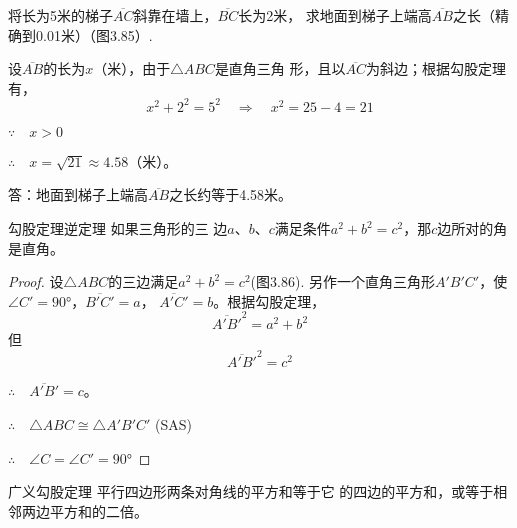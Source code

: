 \begin{example}
将长为5米的梯子$\overline{AC}$斜靠在墙上，$\overline{BC}$长为2米，
求地面到梯子上端高$\overline{AB}$之长（精确到0.01米）（图3.85）.
\end{example}



\begin{solution}
    设$\overline{AB}$的长为$x$（米），由于$\triangle ABC$是直角三角
形，且以$\overline{AC}$为斜边；根据勾股定理有，
\[x^2+2^2=5^2 \quad \Rightarrow\quad x^2=25-4=21\]

$\because\quad x>0$

$\therefore\quad x=\sqrt{21}\approx 4.58$（米）。

答：地面到梯子上端高$\overline{AB}$之长约等于4.58米。
\end{solution}

\begin{Theorem}
    {勾股定理逆定理} 如果三角形的三
边$a$、$b$、$c$满足条件$a^2+b^2=c^2$，那$c$边所对的角是直角。
\end{Theorem}


\begin{proof}
设$\triangle ABC$的三边满足$a^2+b^2=c^2$(图3.86). 
另作一个直角三角形$A'B'C'$，使$\angle C'=\ang{90}$，$\overline{B'C'}=a$，
$\overline{A'C'}=b$。根据勾股定理，
\[\overline{A' B'}^2=a^2+b^2\]
但
\[\overline{A'B'}^2=c^2\]

$\therefore\quad \overline{A'B'}=c$。

$\therefore\quad \triangle ABC\cong \triangle A'B'C'$ (SAS)

$\therefore\quad \angle C=\angle C'=\ang{90}$
\end{proof}

\begin{figure}
    \centering
{}
    \caption{}
\end{figure}

\begin{Theorem}
    {广义勾股定理} 平行四边形两条对角线的平方和等于它
的四边的平方和，或等于相邻两边平方和的二倍。
\end{Theorem}

